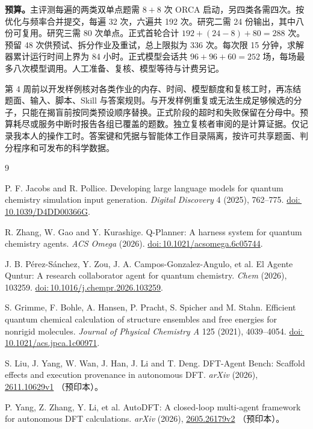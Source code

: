 \documentclass[12pt,a4paper]{article}
\newcommand{\doi}[1]{\href{https://doi.org/#1}{doi:\,#1}}
\begin{document}
\textbf{预算。}主评测每遍的两类双单点题需 $8+8$ 次 ORCA 启动，另四类各需四次。按优化与频率合并提交，每遍 32 次，六遍共 192 次。研究二需 24 份输出，其中八份可复用。研究三需 80 次单点。正式首轮合计 $192+(24-8)+80=288$ 次。预留 48 次供预试、拆分作业及重试，总上限拟为 336 次。每次限 15 分钟，求解器累计运行时间上界为 84 小时。正式模型会话共 $96+96+60=252$ 场，每场最多八次模型调用。人工准备、复核、模型等待与计费另记。

第 4 周前以开发样例核对各类作业的内存、时间、模型额度和复核工时，再冻结题面、输入、脚本、Skill 与答案规则。与开发样例重复或无法生成足够候选的分子，只能在揭盲前按同类预设顺序替换。正式阶段的超时和失败保留在分母中。预算耗尽或服务中断时报告各组已覆盖的题数。独立复核者审阅的是计算证据。仅记录我本人的操作工时。答案键和凭据与智能体工作目录隔离，按许可共享题面、判分程序和可发布的科学数据。

\clearpage
\renewcommand{\bibsection}{\section{参考文献}}
\setlength{\bibsep}{0.65em}
\begin{thebibliography}{9}
\raggedright
{}
P. F. Jacobs and R. Pollice. Developing large language models for quantum
chemistry simulation input generation. \emph{Digital Discovery} 4 (2025),
762--775. \doi{10.1039/D4DD00366G}.

R. Zhang, W. Gao and Y. Kurashige. Q-Planner: A harness system for quantum
chemistry agents. \emph{ACS Omega} (2026). \doi{10.1021/acsomega.6c05744}.

J. B. P\'erez-S\'anchez, Y. Zou, J. A. Campos-Gonzalez-Angulo, et al.
El Agente Quntur: A research collaborator agent for quantum chemistry.
\emph{Chem} (2026), 103259. \doi{10.1016/j.chempr.2026.103259}.

S. Grimme, F. Bohle, A. Hansen, P. Pracht, S. Spicher and M. Stahn.
Efficient quantum chemical calculation of structure ensembles and free
energies for nonrigid molecules. \emph{Journal of Physical Chemistry A}
125 (2021), 4039--4054. \doi{10.1021/acs.jpca.1c00971}.

S. Liu, J. Yang, W. Wan, J. Han, J. Li and T. Deng. DFT-Agent Bench:
Scaffold effects and execution provenance in autonomous DFT.
\emph{arXiv} (2026), \href{https://arxiv.org/abs/2611.10629v1}{2611.10629v1}
（预印本）。

P. Yang, Z. Zhang, Y. Li, et al. AutoDFT: A closed-loop multi-agent framework
for autonomous DFT calculations. \emph{arXiv} (2026),
\href{https://arxiv.org/abs/2605.26179v2}{2605.26179v2} （预印本）。
\end{thebibliography}
\end{document}
